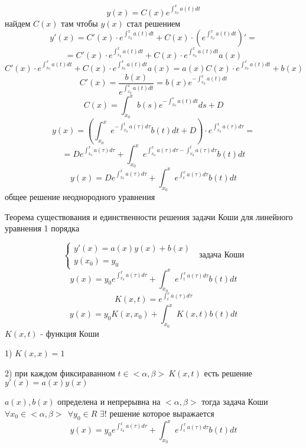 \begin{block}
  $$
  y(x) = C(x) e^{\int_{x_0}^x a(t) dt}
  $$
  найдем $C(x)$ там чтобы $y(x)$ стал решением
  $$
  y'(x) = C'(x) \cdot e^{\int_{x_0}^x a(t) dt} +
  C(x) \cdot \left( e^{\int_{x_0}^x a(t) dt} \right)' =
  $$
  $$
  = C'(x) \cdot e^{\int_{x_0}^x a(t) dt} +
  C(x) \cdot e^{\int_{x_0}^x a(t) dt} a(x)
  $$
  $$
  C'(x) \cdot e^{\int_{x_0}^x a(t) dt} +
  C(x) \cdot e^{\int_{x_0}^x a(t) dt} a(x) =
  a(x) C(x) \cdot e^{\int_{x_0}^x a(t) dt} + b(x)
  $$
  $$
  C'(x) = \frac{b(x)}{e^{\int_{x_0}^x a(t) dt}} =
  b(x) e^{-\int_{x_0}^x a(t) dt}
  $$
  $$
  C(x) = \int_{x_0}^x b(s) e^{-\int_{x_0}^s a(t) dt} ds + D
  $$
  $$
  y(x) = \left( \int_{x_0}^{x} e^{-\int_{x_0}^t a(\tau) d\tau}
  b(t)dt + D \right) \cdot e^{\int_{x_0}^x a(\tau) d\tau} =
  $$
  $$
  = D e^{\int_{x_0}^x a(\tau) d\tau} + \int_{x_0}^x
  e^{\int_{x_0}^x a(\tau) d\tau - \int_{x_0}^t a(\tau) d\tau} b(t)dt
  $$
  $$
  y(x) = D e^{\int_{x_0}^x a(\tau) d\tau} + \int_{x_0}^x
  e^{\int_{t}^x a(\tau) d\tau} b(t)dt
  $$
  общее решение неоднородного уравнения
\end{block}

\begin{title}[\Large]
  Теорема существования и единственности решения задачи Коши для линейного
  уравнения 1 порядка
\end{title}

\begin{block}
  $$
  \left\{
  \begin{array}{l}
    y'(x) = a(x)y(x) + b(x) \\
    y(x_0) = y_0
  \end{array}
  \right. ~~~ \text{задача Коши}
  $$
  $$
  y(x) = y_0 e^{\int_{x_0}^x a(\tau) d\tau} + \int_{x_0}^x
  e^{\int_{t}^x a(\tau) d\tau} b(t)dt
  $$
  $$
  K(x, t) = e^{\int_t^x a(\tau) d\tau}
  $$
  $$
  y(x) = y_0 K(x, x_0) + \int_{x_0}^x K(x, t) b(t) dt
  $$
  $K(x, t)$ - функция Коши
\end{block}

\begin{block}[Свойства]
  1) $K(x, x) = 1$

  2) при каждом фиксираванном $t \in <\alpha, \beta> ~ K(x, t)$ есть решение
  $y'(x) = a(x)y(x)$
\end{block}

\begin{theorem}
  $a(x), b(x)$ определена и непрерывна на $<\alpha, \beta>$
  тогда задача Коши $\forall x_0 \in <\alpha, \beta> ~~ \forall y_0 \in R$
  $\exists !$ решение которое выражается
  $$
  y(x) = y_0 e^{\int_{x_0}^x a(\tau) d\tau} + \int_{x_0}^x
  e^{\int_{t}^x a(\tau) d\tau} b(t)dt
  $$
\end{theorem}

